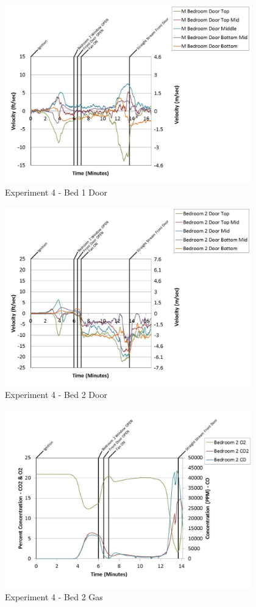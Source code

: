 \documentclass{article}
\begin{document}
\begin{appendices}
	\clearpage

	\begin{figure}[h!]
		\centering
		\includegraphics[height=3.05in]{0_Images/Results_Charts/Exp_4_Charts/Bed1Door.pdf}
		\caption{Experiment 4 - Bed 1 Door}
	\end{figure}
 

	\begin{figure}[h!]
		\centering
		\includegraphics[height=3.05in]{0_Images/Results_Charts/Exp_4_Charts/Bed2Door.pdf}
		\caption{Experiment 4 - Bed 2 Door}
	\end{figure}
 
	\clearpage

	\begin{figure}[h!]
		\centering
		\includegraphics[height=3.05in]{0_Images/Results_Charts/Exp_4_Charts/Bed2Gas.pdf}
		\caption{Experiment 4 - Bed 2 Gas}
	\end{figure}
 


\end{appendices}
\end{document}
